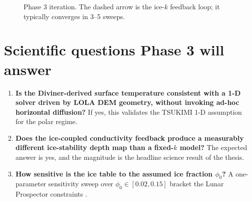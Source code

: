 \begin{figure}[H]
\centering
{}
\caption[Phase 3 iteration]{Phase 3 iteration.  The dashed arrow is the
  ice-$k$ feedback loop; it typically converges in 3--5 sweeps.}
\label{fig:phase3-loop}
\end{figure}

\section{Scientific questions Phase 3 will answer}

\begin{enumerate}
  \item \textbf{Is the Diviner-derived surface temperature consistent
        with a 1-D solver driven by LOLA DEM geometry, without
        invoking ad-hoc horizontal diffusion?}  If yes, this validates
        the TSUKIMI 1-D assumption for the polar regime.
  \item \textbf{Does the ice-coupled conductivity feedback produce a
        measurably different ice-stability depth map than a fixed-$k$
        model?}  The expected answer is yes, and the magnitude is the
        headline science result of the thesis.
  \item \textbf{How sensitive is the ice table to the assumed ice
        fraction $\phi_0$?}  A one-parameter sensitivity sweep over
        $\phi_0 \in [0.02, 0.15]$ bracket the Lunar Prospector
        constraints \citep{feldman2000}.
\end{enumerate}

